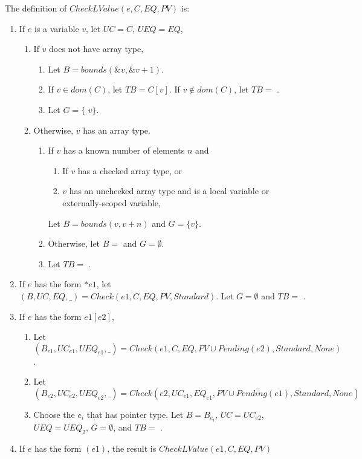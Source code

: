 The definition of $CheckLValue(e, C, EQ, PV)$ is:
\begin{enumerate}
\item If $e$ is a variable $v$, let $UC = C$, $UEQ=EQ$,
\begin{enumerate}
\item If $v$ does not have array type,
\begin{enumerate}
\item Let $B = bounds(\&v,\&v + 1)$.
\item If $v \in dom(C)$, let $TB = C[v]$.  If $v \notin dom(C)$, let $TB =$ \boundsunknown.
\item Let $G=\{$ \code{&}$v \}$.
\end{enumerate}
\item Otherwise, $v$ has an array type.
\begin{enumerate}
\item If $v$ has a known number of elements $n$ and
\begin{enumerate}
\item If $v$ has a checked array type, or
\item $v$ has an unchecked array type and is a local variable or externally-scoped variable,
\end{enumerate}
Let $B = bounds(v, v + n)$ and $G =\{ v \}$.
\item Otherwise, let $B = $ \boundsunknown and $G = \emptyset$.
\item Let $TB = $ \boundsunknown.
\end{enumerate}
\end{enumerate}
\item If $e$ has the form $*e1$,  let $(B, UC, EQ, \_) = Check(e1, C, EQ, PV, Standard)$.  Let $G =\emptyset$ and $TB = $ \boundsunknown.
\item If $e$ has the form $e1[e2]$,
\begin{enumerate}
\item Let $(B_{e1}, {UC}_{e1}, {UEQ}_{e1}, \_) = Check(e1, C, EQ, PV \cup Pending(e2), Standard, 
         None)$.
\item Let $(B_{e2}, {UC}_{e2}, {UEQ}_{e2}, \_) = Check(e2, {UC}_{e1}, {EQ}_{e1},
         PV \cup Pending(e1), Standard, None)$
\item Choose the $e_i$ that has pointer type.   Let $B = B_{e_i}$, $UC = {UC}_{e2}$, 
$UEQ  = {UEQ}_2$,  $G=\emptyset$, and $TB = $ \boundsunknown.
\end{enumerate}
\item If $e$ has the form $(e1)$, the result is $CheckLValue(e1, C, EQ, PV)$
\end{enumerate}

